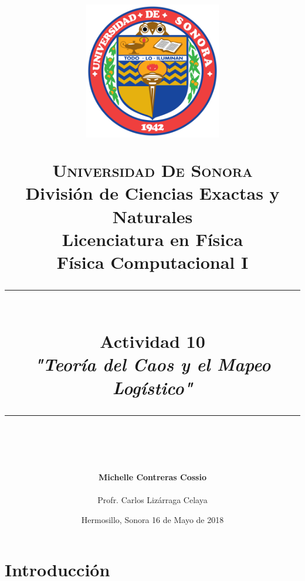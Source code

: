 \documentclass[12pt]{article}
\newcommand{\HRule}[1]{\rule{\linewidth}{#1}}
\begin{document}
\begin{titlepage}

\title{ \normalsize 
        \begin{center}
        \includegraphics[height=6cm]{logo.png}
        \end{center}
        \LARGE \textsc{\textbf{Universidad De Sonora}} \\ \bigskip
		\Large División de Ciencias Exactas y Naturales \\
        Licenciatura en Física \\ \bigskip
        \bigskip
        Física Computacional I
		\\ [0.1cm]  
		\HRule{2pt} \\
		\Large \textbf{{Actividad 10}} \\
        \textit{\textbf{"Teoría del Caos y el Mapeo Logístico"}}
		\HRule{2pt} \\
		\normalsize \vspace*{0.001\baselineskip}}
        
\date{\bigskip \Large Hermosillo, Sonora  \hspace*{\fill} 16 de Mayo de 2018}

        
\author{
		\Large\textbf{ Michelle Contreras Cossio} \\ \bigskip
        \\ \bigskip
\Large Profr. Carlos Lizárraga Celaya}
       \end{titlepage}
       \maketitle
       

\newpage
\pagestyle{plain}

\section{Introducción}
\end{document}
